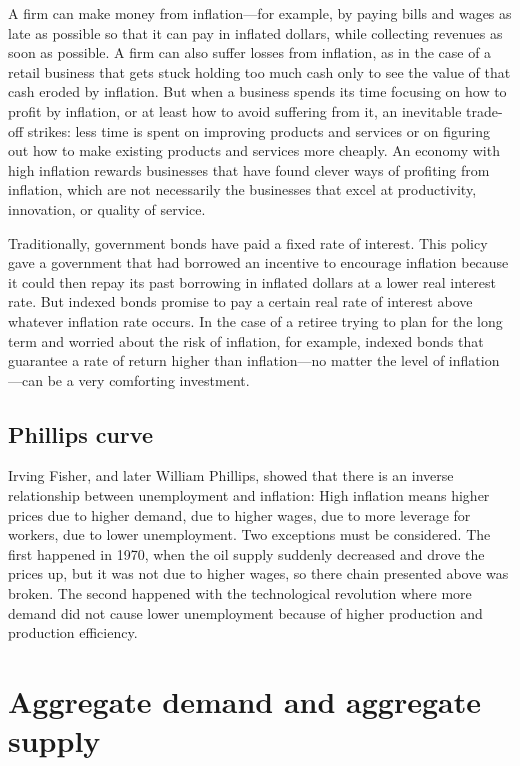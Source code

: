 A firm can make money from inflation—for example, by paying bills and wages as late as possible so that it can pay in inflated dollars, while collecting revenues as soon as possible. A firm can also suffer losses from inflation, as in the case of a retail business that gets stuck holding too much cash only to see the value of that cash eroded by inflation. But when a business spends its time focusing on how to profit by inflation, or at least how to avoid suffering from it, an inevitable trade-off strikes: less time is spent on improving products and services or on figuring out how to make existing products and services more cheaply. An economy with high inflation rewards businesses that have found clever ways of profiting from inflation, which are not necessarily the businesses that excel at productivity, innovation, or quality of service.

Traditionally, government bonds have paid a fixed rate of interest. This policy gave a government that had borrowed an incentive to encourage inflation because it could then repay its past borrowing in inflated dollars at a lower real interest rate. But indexed bonds promise to pay a certain real rate of interest above whatever inflation rate occurs. In the case of a retiree trying to plan for the long term and worried about the risk of inflation, for example, indexed bonds that guarantee a rate of return higher than inflation—no matter the level of inflation—can be a very comforting investment.

\subsection{Phillips curve}

Irving Fisher, and later William Phillips, showed that there is an inverse relationship between unemployment and inflation: High inflation means higher prices due to higher demand, due to higher wages, due to more leverage for workers, due to lower unemployment. Two exceptions must be considered. The first happened in 1970, when the oil supply suddenly decreased and drove the prices up, but it was not due to higher wages, so there chain presented above was broken. The second happened with the technological revolution where more demand did not cause lower unemployment because of higher production and production efficiency.

\section{Aggregate demand and aggregate supply}
